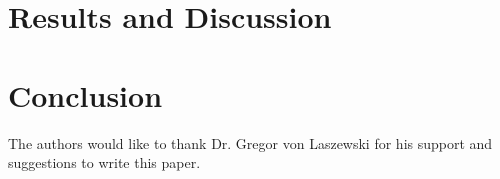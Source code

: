 \section{Results and Discussion}



\section{Conclusion}


\begin{acks}

  The authors would like to thank Dr. Gregor von Laszewski for his
  support and suggestions to write this paper.

\end{acks}


 

